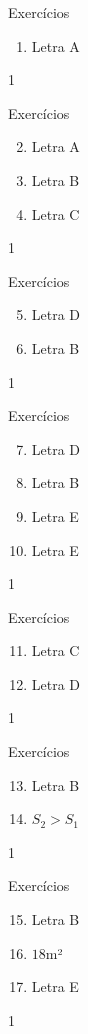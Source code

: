 \exercise
\begin{answer}{Exercícios}
{\exerciselist
  \begin{enumerate}
  \item Letra A
  \end{enumerate}
}{1}
\end{answer}
\clearmargin
\begin{answer}{Exercícios}
{\exerciselist
  \begin{enumerate}\setcounter{enumi}{1}
  \item Letra A
  \item Letra B
  \item Letra C
  \end{enumerate}
}{1}
\end{answer}
\clearmargin
\begin{answer}{Exercícios}
{\exerciselist
  \begin{enumerate}\setcounter{enumi}{4}
  \item Letra D
  \item Letra B
  \end{enumerate}
}{1}
\end{answer}
\clearmargin
\begin{answer}{Exercícios}
{\exerciselist
  \begin{enumerate}\setcounter{enumi}{6}
  \item Letra D
  \item Letra B
  \item Letra E
  \item Letra E
  \end{enumerate}
}{1}
\end{answer}
\clearmargin
\begin{answer}{Exercícios}
{\exerciselist
  \begin{enumerate}\setcounter{enumi}{10}
  \item Letra C
  \item Letra D
  \end{enumerate}
}{1}
\end{answer}
\clearmargin
\begin{answer}{Exercícios}
{\exerciselist
  \begin{enumerate}\setcounter{enumi}{12}
  \item Letra B
  \item $S_2>S_1$
  \end{enumerate}
}{1}
\end{answer}
\clearmargin
\begin{answer}{Exercícios}
{\exerciselist
  \begin{enumerate}\setcounter{enumi}{14}
  \item Letra B
  \item $18$m²
  \item Letra E
  \end{enumerate}
}{1}
\end{answer}
